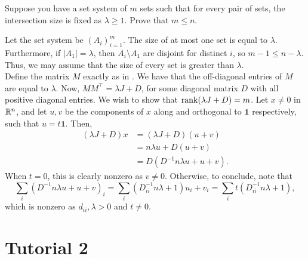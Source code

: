 \documentclass{article}
\begin{document}
	\begin{exercise}
		Suppose you have a set system of $m$ sets such that for every pair of sets, the intersection size is fixed as $\lambda \ge 1$. Prove that $m \le n$.
	\end{exercise}
	\begin{solution*}
		Let the set system be $(A_{i})_{i=1}^m$. The size of at most one set is equal to $\lambda$. Furthermore, if $|A_1| = \lambda$, then $A_i \setminus A_1$ are disjoint for distinct $i$, so $m-1 \le n-\lambda$. Thus, we may assume that the size of every set is greater than $\lambda$.\\
		Define the matrix $M$ exactly as in . We have that the off-diagonal entries of $M$ are equal to $\lambda$. Now, $MM^\top = \lambda J + D$, for some diagonal matrix $D$ with all positive diagonal entries. We wish to show that $\operatorname{rank}(\lambda J + D) = m$. Let $x \ne 0$ in $\mathbb{R}^n$, and let $u,v$ be the components of $x$ along and orthogonal to $\mathbf{1}$ respectively, such that $u = t\mathbf{1}$. Then,
		\begin{align*}
			(\lambda J + D)x &= (\lambda J + D)(u+v) \\
				&= n\lambda u + D(u+v) \\
				&= D (D^{-1}n\lambda u + u+v).
		\end{align*}
		When $t = 0$, this is clearly nonzero as $v \ne 0$. Otherwise, to conclude, note that
		\[ \sum_i (D^{-1}n\lambda u + u + v)_i = \sum_i (D_{ii}^{-1} n \lambda + 1) u_i + v_i = \sum_i t(D_{ii}^{-1}n\lambda + 1),  \]
		which is nonzero as $d_{ii},\lambda > 0$ and $t \ne 0$.
	\end{solution*}

\section{Tutorial 2}
\end{document}
